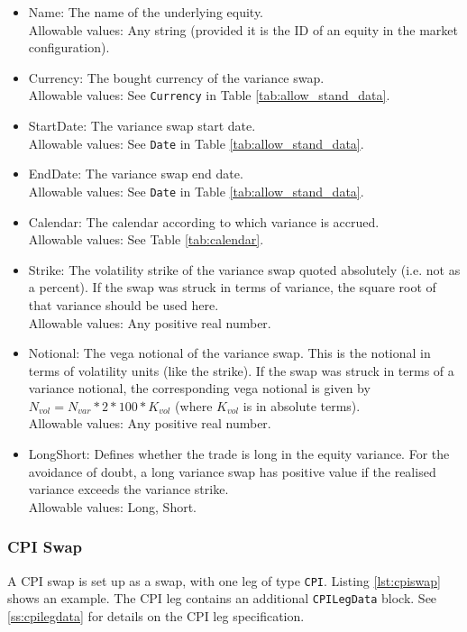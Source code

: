 \begin{itemize}
	\item Name: The name of the underlying equity. \\
	Allowable values:  Any string (provided it is the ID of an equity in the market configuration).
	\item Currency: The bought currency of the variance swap. \\
	Allowable values:  See \lstinline!Currency! in Table \ref{tab:allow_stand_data}.	
	\item StartDate: The variance swap start date. \\
	Allowable values:  See \lstinline!Date! in Table \ref{tab:allow_stand_data}.	
	\item EndDate: The variance swap end date. \\
	Allowable values:  See \lstinline!Date! in Table \ref{tab:allow_stand_data}.	
	\item Calendar: The calendar according to which variance is accrued. \\
	Allowable values: See Table \ref{tab:calendar}.
	\item Strike: The volatility strike of the variance swap quoted absolutely (i.e. not as a percent). If the swap was struck in terms of variance, the square root of that variance should be used here.\\
	Allowable values:  Any positive real number.
	\item Notional: The vega notional of the variance swap. This is the notional in terms of volatility units (like the strike). If the swap was struck in terms of a variance notional, the corresponding vega notional is given by $N_{vol} = N_{var} * 2 * 100 * K_{vol}$ (where $K_{vol}$ is in absolute terms).\\
	Allowable values:  Any positive real number.
	\item LongShort: Defines whether the trade is long in the equity variance. For the avoidance of doubt, a long variance swap has positive value if the realised variance exceeds the variance strike. \\
	Allowable values: Long, Short.
\end{itemize}

\subsubsection{CPI Swap}

A CPI swap is set up as a swap, with one leg of type {\tt CPI}. Listing \ref{lst:cpiswap} shows an example. The
CPI leg contains an additional {\tt CPILegData} block. See \ref{ss:cpilegdata} for details on the CPI leg specification.

